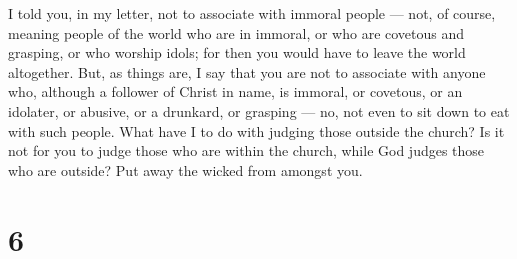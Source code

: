  I told you, in my letter, not to associate with immoral
people ---  not, of course, meaning people of the world who
are in immoral, or who are covetous and grasping, or who worship idols;
for then you would have to leave the world altogether. 
But, as things are, I say that you are not to associate with anyone who,
although a follower of Christ in name, is immoral, or covetous, or an
idolater, or abusive, or a drunkard, or grasping --- no, not even to sit
down to eat with such people.  What have I to do with
judging those outside the church? Is it not for you to judge those who
are within the church,  while God judges those who are
outside? Put away the wicked from amongst you.

\hypertarget{section-5}{%
\section{6}\label{section-5}}

